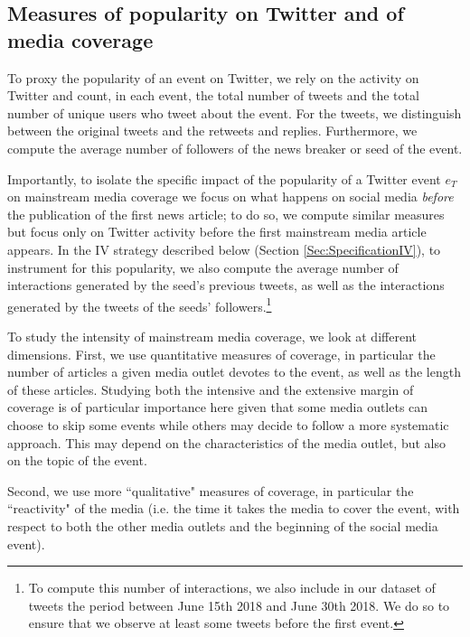 \subsection{Measures of popularity on Twitter and of media coverage}

To proxy the popularity of an event on Twitter, we rely on the activity on Twitter and count, in each event, the total number of tweets and the total number of unique users who tweet about the event. For the tweets, we distinguish between the original tweets and the retweets and replies. Furthermore, we compute the average number of followers of the news breaker or seed of the event.

Importantly, to isolate the specific impact of the popularity of a Twitter event $e_T$ on mainstream media coverage we focus on what happens on social media \textit{before} the publication of the first news article; to do so, we compute similar measures but focus only on Twitter activity before the first mainstream media article appears. In the IV strategy described below (Section \ref{Sec:SpecificationIV}), to instrument for this popularity, we also compute the average number of interactions generated by the seed's previous tweets, as well as the interactions generated by the tweets of the seeds' followers.\footnote{To compute this number of interactions, we also include in our dataset of tweets the period between June 15th 2018 and June 30th 2018. We do so to ensure that we observe at least some tweets before the first event.} 


To study the intensity of mainstream media coverage, we look at different dimensions. First, we use quantitative measures of coverage, in particular the number of articles a given media outlet devotes to the event, as well as the length of these articles. Studying both the intensive and the extensive margin of coverage is of particular importance here given that some media outlets can choose to skip some events while others may decide to follow a more systematic approach. This may depend on the characteristics of the media outlet, but also on the topic of the event.

Second, we use more ``qualitative" measures of coverage, in particular the ``reactivity" of the media (i.e. the time it takes the media to cover the event, with respect to both the other media outlets and the beginning of the social media event).


